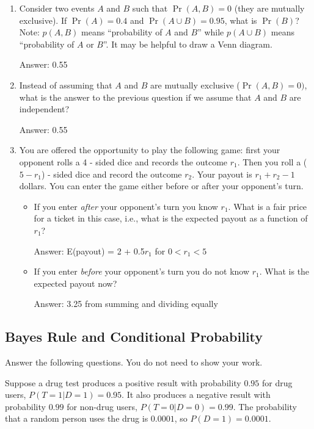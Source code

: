 \documentclass{article}
\def\ans#1{\par\gre{Answer: #1}}
\def\blu#1{{\color{blu}#1}}
\def\gre#1{{\color{gre}#1}}
\begin{document}
\begin{enumerate}
\item Consider two events $A$ and $B$ such that $\Pr(A, B)=0$ (they are mutually exclusive). If $\Pr(A) = 0.4$ and $\Pr(A \cup B) = 0.95$, what is $\Pr(B)$? Note: $p(A, B)$ means
``probability of $A$ and $B$'' while $p(A \cup B)$ means ``probability of $A$ or $B$''. It may be helpful to draw a Venn diagram.
\ans{0.55}
\item Instead of assuming that $A$ and $B$ are mutually exclusive ($\Pr(A,B) = 0)$, what is the answer to the previous question if we assume that $A$ and $B$ are independent?
\ans{0.55}
\item You are offered the opportunity to play the following game: first your opponent rolls a 4\! -\! sided dice and records the outcome $r_1$. Then you roll a ($5-r_1$)\! -\! sided dice and record the outcome $r_2$. Your payout is $r_1+r_2-1$ dollars. You can enter the game either before or after your opponent's turn.
\begin{itemize}
  \item If you enter \emph{after} your opponent's turn you know $r_1$. What is a fair price for a ticket in this case, i.e., what is the expected payout as a function of $r_1$?
\ans{E(payout) = 2 + 0.5$r_1$ for $0 < r_1 < 5$ }
  \item If you enter \emph{before} your opponent's turn you do not know $r_1$. What is the expected payout now?
\ans{3.25 from summing and dividing equally}
\end{itemize}
\end{enumerate}

\pagebreak
\subsection{Bayes Rule and Conditional Probability}

\blu{Answer the following questions.} You do not need to show your work.

Suppose a drug test produces a positive result with probability $0.95$ for drug users, $P(T=1|D=1)=0.95$. It also produces a negative result with probability $0.99$ for non-drug users, $P(T=0|D=0)=0.99$. The probability that a random person uses the drug is $0.0001$, so $P(D=1)=0.0001$.
\end{document}
